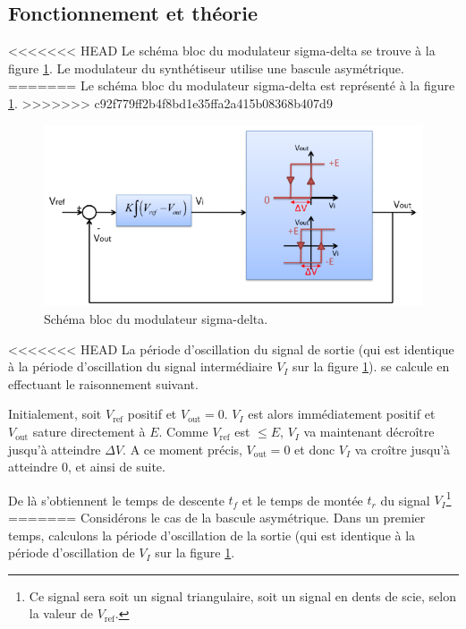 

\subsection{Fonctionnement et théorie}
<<<<<<< HEAD
Le schéma bloc du modulateur sigma-delta se trouve
à la figure \ref{fig:sigma-delta-schema-blocs}. Le
modulateur du synthétiseur utilise une bascule asymétrique.
=======
Le schéma bloc du modulateur sigma-delta est représenté
à la figure \ref{fig:sigma-delta-schema-blocs}. 
>>>>>>> c92f779ff2b4f8bd1e35ffa2a415b08368b407d9

\begin{figure}[ht]
	\centering
	\includegraphics[scale=0.75]{img/schema-blocs.png}
	\caption{Schéma bloc du modulateur sigma-delta.}
	\label{fig:sigma-delta-schema-blocs}
\end{figure}

<<<<<<< HEAD
La période d'oscillation du signal de sortie (qui est 
identique à la période d'oscillation du signal intermédiaire
$V_I$ sur la figure \ref{fig:sigma-delta-schema-blocs}).
se calcule en effectuant le raisonnement suivant.

Initialement, soit $V_{\text{ref}}$  positif et
$V_{\text{out}} = 0$. $V_I$ est alors immédiatement positif
et $V_{\text{out}}$ sature directement à $E$. Comme $V_{\text{ref}}$
est $\leq E$, $V_I$ va maintenant décroître jusqu'à atteindre
$\Delta V$. A ce moment précis, $V_{\text{out}} = 0$
et donc $V_I$ va croître jusqu'à atteindre 0, et ainsi de suite.

De là s'obtiennent le temps de descente $t_f$ et le temps de montée $t_r$
du signal $V_I$\footnote{Ce signal sera soit un signal triangulaire,
soit un signal en dents de scie, selon la valeur de $V_{\text{ref}}$.}
=======
Considérons le cas de la bascule asymétrique.
Dans un premier temps, calculons la période
d'oscillation de la sortie (qui est identique
à la période d'oscillation de $V_I$ sur la figure
\ref{fig:sigma-delta-schema-blocs}.

